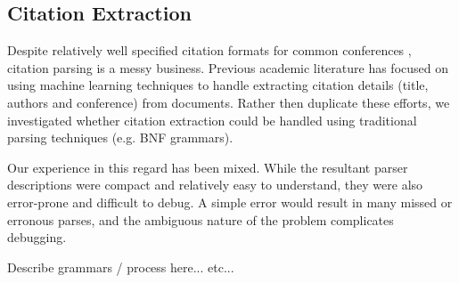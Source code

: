 \subsection{Citation Extraction}
Despite relatively well specified citation formats for common conferences
\cite{acm}, citation parsing is a messy business.  Previous academic literature
has focused on using machine learning techniques \cite{citeseer} to handle extracting citation
details (title, authors and conference) from documents.  Rather then duplicate
these efforts, we investigated whether citation extraction could be handled using
traditional parsing techniques (e.g. BNF grammars).

Our experience in this regard has been mixed.  While the resultant parser 
descriptions were compact and relatively easy to understand, they were 
also error-prone and difficult to debug.  A simple error would result in
many missed or erronous parses, and the ambiguous nature of the problem
complicates debugging.

Describe grammars / process here... etc...
